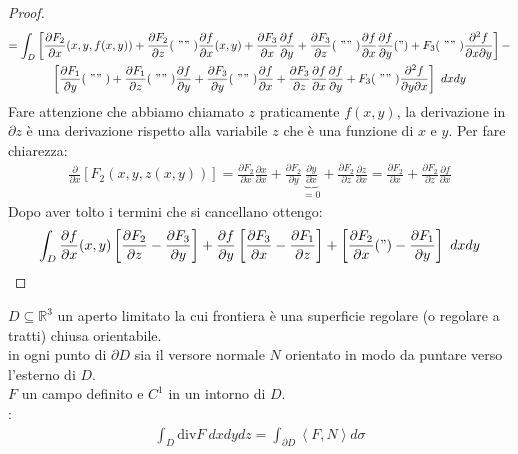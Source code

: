 \documentclass[a4paper, oneside]{article}
\newcommand\de{\partial}
\begin{document}
\begin{proof}
\begin{gather*}
    = \int_D \left[ \frac{\partial F_2}{\partial x} ( x,y,f(x,y) ) + \frac{\partial F_2}{\partial z} ( \ "" \ ) \frac{\partial f}{\partial x}(x,y) + \frac{\partial F_3}{\partial x}\frac{\partial f}{\partial y} + \frac{\partial F_3}{\partial z} ( \ "" \ ) \frac{\partial f}{\partial x}\frac{\partial f}{\partial y}(") + F_3( \ "" \ ) \frac{\partial^2 f}{\partial x \partial y} \right] - \\
    \left[ \frac{\partial F_1}{\partial y} ( \ "" \ ) + \frac{\partial F_1}{\partial z} ( \ "" \ ) \frac{\partial f}{\partial y} + \frac{\partial F_3}{\partial y} ( \ "" \ ) \frac{\partial f}{\partial x} + \frac{\partial F_3}{\partial z}\frac{\partial f}{\partial x}\frac{\partial f}{\partial y} + F_3( \ "" \ ) \frac{\partial^2 f}{\partial y \partial x} \right] \ dxdy
  \end{gather*}
  Fare attenzione che abbiamo chiamato $z$ praticamente $f(x,y)$, la derivazione in $\de z$ è una derivazione rispetto alla variabile $z$ che è una funzione di $x$ e $y$. Per fare chiarezza:
  \begin{gather*}
    \frac{\de }{\de x} \left[ F_2(x,y,z(x,y)) \right] = \frac{\de F_2}{\de x} \frac{\de x}{\de x} + \frac{\de F_2}{\de y} \underbrace{\frac{\de y}{\de x}}_{= 0} + \frac{\de F_2}{\de z} \frac{\de z}{\de x} = \frac{\de F_2}{\de x} +  \frac{\de F_2}{\de z} \frac{\de f}{\de x} 
  \end{gather*}
  Dopo aver tolto i termini che si cancellano ottengo:
  \begin{gather*}
    \int_D \frac{\partial f}{\partial x} (x,y) \left[ \frac{\partial F_2}{\partial z} - \frac{\partial F_3}{\partial y} \right] + \frac{\partial f}{\partial y}\left[ \frac{\partial F_3}{\partial x} -\frac{\partial F_1}{\partial z}\right] + \left[ \frac{\partial F_2}{\partial x}( " )- \frac{\partial F_1}{\partial y} \right] \ dxdy   
  \end{gather*}
\end{proof}


\begin{theorem}
   $D \subseteq \mathbb{R}^3$ un aperto limitato la cui frontiera è una superficie regolare (o regolare a tratti) chiusa orientabile.\\
   in ogni punto di $\partial D$ sia il versore normale $N$ orientato in modo da puntare verso l'esterno di $D$.\\
   $F$ un campo definito e $C^1$ in un intorno di $D$.\\
  :
  \begin{gather*}
    \int_D  \text{div}F \ dxdydz = \int_{\partial D} \left\langle F , N \right\rangle d\sigma
  \end{gather*} 
\end{theorem}
\end{document}

